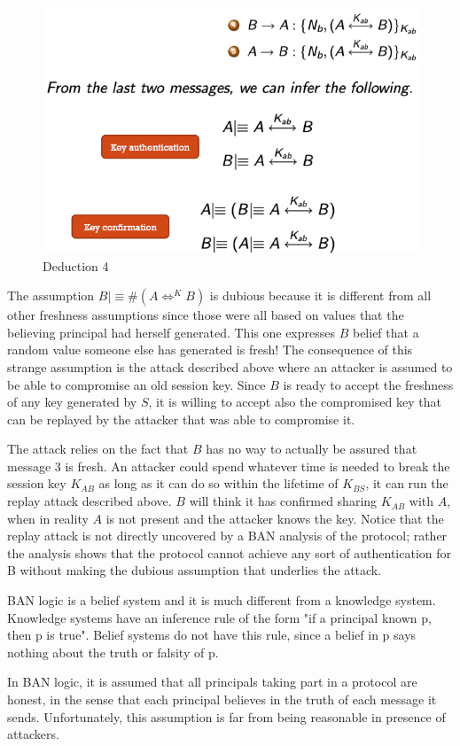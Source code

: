 \begin{figure}
	\centering
	\includegraphics[width=0.7\linewidth]{Images/Chapter4/deduction4}
	\caption{Deduction 4}
	\label{fig:deduction4}
\end{figure}

The assumption $ B \mid \equiv \#(A \Leftrightarrow^K B)$ is dubious because it is different from all other freshness assumptions since those were all based on values that the believing principal had herself generated. This one expresses $B$ belief that a random value someone else has generated is fresh! The consequence of this strange assumption is the attack described above where an attacker is assumed to be able to compromise an old session key. Since $B$ is ready to accept the freshness of any key generated by $S$, it is willing to accept also the compromised key that can be replayed by the attacker that was able to compromise it.



The attack relies on the fact that $B$ has no way to actually be assured that message 3 is fresh. An attacker could spend whatever time is needed to break the session key $K_{AB}$ as long as it can do so within the lifetime of $K_{BS}$, it can run the replay attack described above. $B$ will think it has confirmed sharing $K_{AB}$ with $A$, when in reality $A$ is not present and the attacker knows the key. Notice that the replay attack is not directly uncovered by a BAN analysis of the protocol; rather the analysis shows that the protocol cannot achieve any sort of authentication for B without making the dubious assumption that underlies the attack.

BAN logic is a belief system and it is much different from a knowledge system. Knowledge systems have an inference rule of the form "if a principal known p, then p is true". Belief systems do not have this rule, since a belief in p says nothing about the truth or falsity of p.

In BAN logic, it is assumed that all principals taking part in a protocol are honest, in the sense that each principal believes in the truth of each message it sends. Unfortunately, this assumption is far from being reasonable in presence of attackers.

